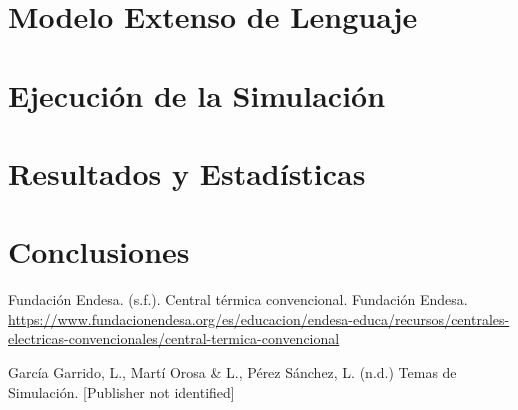 \documentclass[twocolumn, fontsize=10pt]{article}
\begin{document}
\section{Modelo Extenso de Lenguaje}

\section{Ejecución de la Simulación}

\section{Resultados y Estadísticas}

\section{Conclusiones}


\renewcommand\refname{Referencias}

\begin{thebibliography}{}

  \sloppypar
   Fundación Endesa. (s.f.). Central térmica convencional. Fundación Endesa. \url{https://www.fundacionendesa.org/es/educacion/endesa-educa/recursos/centrales-electricas-convencionales/central-termica-convencional}


   García Garrido, L., Martí Orosa \& L., Pérez Sánchez, L. (n.d.) Temas de Simulación. [Publisher not identified]

\end{thebibliography}
    
    
\end{document}
